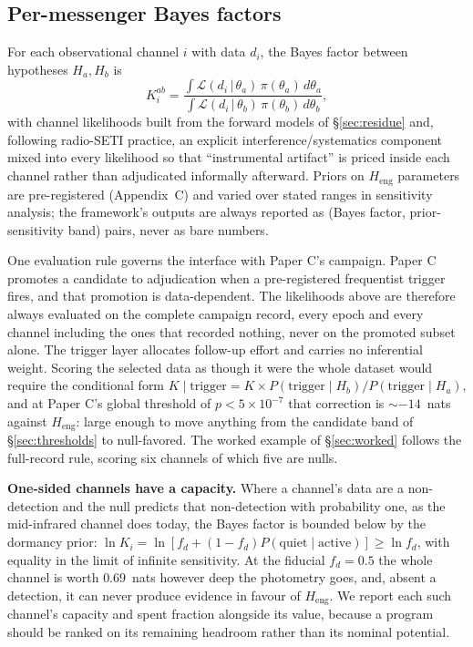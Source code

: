 \documentclass[11pt]{article}
\newcommand{\lnK}{\ensuremath{\ln K}}
\newcommand{\Heng}{\ensuremath{H_{\mathrm{eng}}}}
\begin{document}
\subsection{Per-messenger Bayes factors}
\label{sec:perchannel}

For each observational channel $i$ with data $d_{i}$, the Bayes factor between hypotheses $H_{a}, H_{b}$ is
\begin{equation}
K_{i}^{ab} = \frac{\int \mathcal{L}(d_{i}\,|\,\theta_{a})\,\pi(\theta_{a})\,d\theta_{a}}
{\int \mathcal{L}(d_{i}\,|\,\theta_{b})\,\pi(\theta_{b})\,d\theta_{b}},
\end{equation}
with channel likelihoods built from the forward models of \S\ref{sec:residue} and, following radio-SETI practice, an explicit interference/systematics component mixed into every likelihood \citep{Sheikh2021,Li2026} so that ``instrumental artifact'' is priced inside each channel rather than adjudicated informally afterward. Priors on \Heng{} parameters are pre-registered (Appendix~C) and varied over stated ranges in sensitivity analysis; the framework's outputs are always reported as (Bayes factor, prior-sensitivity band) pairs, never as bare numbers.

One evaluation rule governs the interface with Paper C's campaign. Paper C promotes a candidate to adjudication when a pre-registered frequentist trigger fires, and that promotion is data-dependent. The likelihoods above are therefore always evaluated on the complete campaign record, every epoch and every channel including the ones that recorded nothing, never on the promoted subset alone. The trigger layer allocates follow-up effort and carries no inferential weight. Scoring the selected data as though it were the whole dataset would require the conditional form $K \mid \mathrm{trigger} = K \times P(\mathrm{trigger}\mid H_{b})/P(\mathrm{trigger}\mid H_{a})$, and at Paper C's global threshold of $p < 5\times10^{-7}$ that correction is $\sim -14$~nats against \Heng: large enough to move anything from the candidate band of \S\ref{sec:thresholds} to null-favored. The worked example of \S\ref{sec:worked} follows the full-record rule, scoring six channels of which five are nulls.

\textbf{One-sided channels have a capacity.} Where a channel's data are a non-detection and the null predicts that non-detection with probability one, as the mid-infrared channel does today, the Bayes factor is bounded below by the dormancy prior: $\lnK_{i} = \ln[f_{d} + (1-f_{d})P(\mathrm{quiet}\mid\mathrm{active})] \geq \ln f_{d}$, with equality in the limit of infinite sensitivity. At the fiducial $f_{d} = 0.5$ the whole channel is worth $0.69$~nats however deep the photometry goes, and, absent a detection, it can never produce evidence in favour of \Heng. We report each such channel's capacity and spent fraction alongside its value, because a program should be ranked on its remaining headroom rather than its nominal potential.
\end{document}
